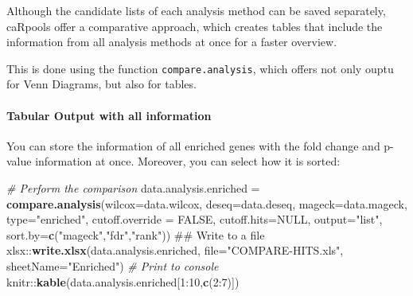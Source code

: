 \documentclass[]{article}
\newenvironment{Shaded}{\begin{snugshade}}{\end{snugshade}}
\newcommand{\KeywordTok}[1]{\textcolor[rgb]{0.13,0.29,0.53}{\textbf{{#1}}}}
\newcommand{\DataTypeTok}[1]{\textcolor[rgb]{0.13,0.29,0.53}{{#1}}}
\newcommand{\DecValTok}[1]{\textcolor[rgb]{0.00,0.00,0.81}{{#1}}}
\newcommand{\StringTok}[1]{\textcolor[rgb]{0.31,0.60,0.02}{{#1}}}
\newcommand{\CommentTok}[1]{\textcolor[rgb]{0.56,0.35,0.01}{\textit{{#1}}}}
\newcommand{\OtherTok}[1]{\textcolor[rgb]{0.56,0.35,0.01}{{#1}}}
\newcommand{\NormalTok}[1]{{#1}}
\let\oldparagraph\paragraph
\renewcommand{\paragraph}[1]{\oldparagraph{#1}\mbox{}}
\begin{document}
Although the candidate lists of each analysis method can be saved
separately, caRpools offer a comparative approach, which creates tables
that include the information from all analysis methods at once for a
faster overview.

This is done using the function \texttt{compare.analysis}, which offers
not only ouptu for Venn Diagrams, but also for tables.

\paragraph{Tabular Output with all
information}\label{tabular-output-with-all-information}

You can store the information of all enriched genes with the fold change
and p-value information at once. Moreover, you can select how it is
sorted:

\begin{Shaded}
\begin{Highlighting}[]
\CommentTok{# Perform the comparison}
\NormalTok{data.analysis.enriched =}\StringTok{ }\KeywordTok{compare.analysis}\NormalTok{(}\DataTypeTok{wilcox=}\NormalTok{data.wilcox,}
    \DataTypeTok{deseq=}\NormalTok{data.deseq, }\DataTypeTok{mageck=}\NormalTok{data.mageck, }\DataTypeTok{type=}\StringTok{"enriched"}\NormalTok{,}
    \DataTypeTok{cutoff.override =} \OtherTok{FALSE}\NormalTok{, }\DataTypeTok{cutoff.hits=}\OtherTok{NULL}\NormalTok{, }\DataTypeTok{output=}\StringTok{"list"}\NormalTok{,}
    \DataTypeTok{sort.by=}\KeywordTok{c}\NormalTok{(}\StringTok{"mageck"}\NormalTok{,}\StringTok{"fdr"}\NormalTok{,}\StringTok{"rank"}\NormalTok{))}
\NormalTok{## Write to a file}
\NormalTok{xlsx::}\KeywordTok{write.xlsx}\NormalTok{(data.analysis.enriched,}
    \DataTypeTok{file=}\StringTok{"COMPARE-HITS.xls"}\NormalTok{,}
    \DataTypeTok{sheetName=}\StringTok{"Enriched"}\NormalTok{)}
\CommentTok{# Print to console}
\NormalTok{knitr::}\KeywordTok{kable}\NormalTok{(data.analysis.enriched[}\DecValTok{1}\NormalTok{:}\DecValTok{10}\NormalTok{,}\KeywordTok{c}\NormalTok{(}\DecValTok{2}\NormalTok{:}\DecValTok{7}\NormalTok{)])}
\end{Highlighting}
\end{Shaded}
\end{document}
